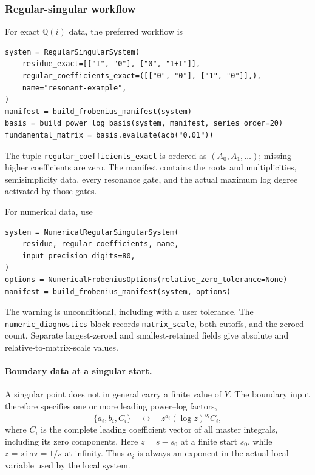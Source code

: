 \documentclass[11pt]{article}
\begin{document}
\subsubsection{Regular-singular workflow}

For exact $\mathbb Q(i)$ data, the preferred workflow is
\begin{verbatim}
system = RegularSingularSystem(
    residue_exact=[["I", "0"], ["0", "1+I"]],
    regular_coefficients_exact=([["0", "0"], ["1", "0"]],),
    name="resonant-example",
)
manifest = build_frobenius_manifest(system)
basis = build_power_log_basis(system, manifest, series_order=20)
fundamental_matrix = basis.evaluate(acb("0.01"))
\end{verbatim}
The tuple \texttt{regular\_coefficients\_exact} is ordered as
$(A_0,A_1,\ldots)$; missing higher coefficients are zero.  The manifest contains the roots
and multiplicities, semisimplicity data, every resonance gate, and the actual maximum log
degree activated by those gates.

For numerical data, use
\begin{verbatim}
system = NumericalRegularSingularSystem(
    residue, regular_coefficients, name,
    input_precision_digits=80,
)
options = NumericalFrobeniusOptions(relative_zero_tolerance=None)
manifest = build_frobenius_manifest(system, options)
\end{verbatim}
The warning is unconditional, including with a user tolerance.  The
\texttt{numeric\_diagnostics} block records \texttt{matrix\_scale}, both cutoffs, and the
zeroed count.  Separate largest-zeroed and smallest-retained fields give absolute and
relative-to-matrix-scale values.

\paragraph{Boundary data at a singular start.}
\label{sec:frobenius-boundary}

A singular point does not in general carry a finite value of $Y$.  The boundary input
therefore specifies one or more leading power--log factors,
\begin{equation}
  \bigl\{a_i,b_i,C_i\bigr\}
  \quad\longleftrightarrow\quad
  z^{a_i}(\log z)^{b_i}C_i,
  \label{eq:frobenius-boundary-record}
\end{equation}
where $C_i$ is the complete leading coefficient vector of all master integrals, including
its zero components.  Here $z=s-s_0$ at a finite start $s_0$, while $z=\texttt{sinv}=1/s$
at infinity.  Thus $a_i$ is always an exponent in the actual local variable used by the
local system.
\end{document}
